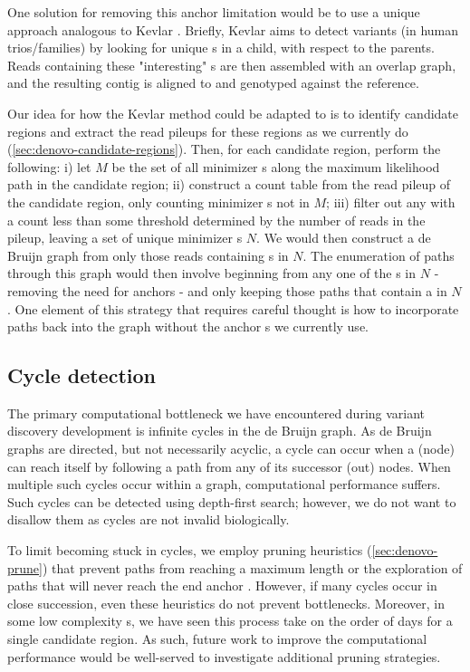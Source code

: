 One solution for removing this anchor \kmer{} limitation would be to use a unique \kmer{} approach analogous to Kevlar \cite{Standage2019}. Briefly, Kevlar aims to detect \denovo{} variants (in human trios/families) by looking for unique \kmer{}s in a child, with respect to the parents. Reads containing these "interesting" \kmer{}s are then assembled with an overlap graph, and the resulting contig is aligned to and genotyped against the reference.

Our idea for how the Kevlar method could be adapted to \pandora{} is to identify candidate regions and extract the read pileups for these regions as we currently do (\autoref{sec:denovo-candidate-regions}). Then, for each candidate region, perform the following: i) let $M$ be the set of all minimizer \kmer{}s along the maximum likelihood path in the candidate region; ii) construct a \kmer{} count table from the read pileup of the candidate region, only counting minimizer \kmer{}s not in $M$; iii) filter out any \kmer{} with a count less than some threshold determined by the number of reads in the pileup, leaving a set of unique minimizer \kmer{}s $N$. We would then construct a de Bruijn graph from only those reads containing \kmer{}s in $N$. The enumeration of paths through this graph would then involve beginning from any one of the \kmer{}s in $N$ - removing the need for anchors - and only keeping those paths that contain a \kmer{} in $N$. One element of this strategy that requires careful thought is how to incorporate paths back into the graph without the anchor \kmer{}s we currently use.

\subsection{Cycle detection}
\label{sec:denovo-cycles}
The primary computational bottleneck we have encountered during \denovo{} variant discovery development is infinite cycles in the de Bruijn graph. As de Bruijn graphs are directed, but not necessarily acyclic, a cycle can occur when a \kmer{} (node) can reach itself by following a path from any of its successor (out) nodes. When multiple such cycles occur within a graph, computational performance suffers. Such cycles can be detected using depth-first search; however, we do not want to disallow them as cycles are not invalid biologically. 

To limit becoming stuck in cycles, we employ pruning heuristics (\autoref{sec:denovo-prune}) that prevent paths from reaching a maximum length or the exploration of paths that will never reach the end anchor \kmer{}. However, if many cycles occur in close succession, even these heuristics do not prevent bottlenecks. Moreover, in some low complexity \prg{}s, we have seen this process take on the order of days for a single candidate region. As such, future work to improve the computational performance would be well-served to investigate additional pruning strategies. 

